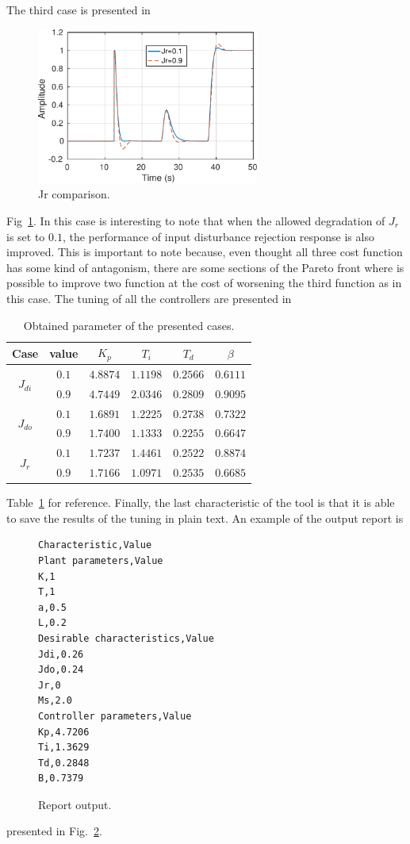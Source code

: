 The third case is presented in %
\begin{figure}
	\centering
	\includegraphics[width=0.65\textwidth]{figuras/jr_comp}
	\caption{Jr comparison.}
	\label{f:jr_comp}
\end{figure}
%
Fig~\ref{f:jr_comp}. In this case is interesting to note that when the allowed degradation of $J_r$ is set to $0.1$, the performance of input disturbance rejection response is also improved. This is important to note because, even thought all three cost function has some kind of antagonism, there are some sections of the Pareto front where is possible to improve two function at the cost of worsening the third function as in this case. The tuning of all the controllers are presented in
%
\begin{table}
	\caption{Obtained parameter of the presented cases.}
	\label{tab:Tunings}
	\centering
	\begin{tabular}{cccccc}
		\toprule
		Case & value & $K_p$ & $T_i$ & $T_d$ & $\beta$\\
		\midrule
		\multirow{2}{*}{$J_{di}$} & $0.1$ & $4.8874$ & $1.1198$ & $0.2566$ & $0.6111$\\
								  & $0.9$ & $4.7449$ & $2.0346$ & $0.2809$ & $0.9095$ \\
		\midrule
		\multirow{2}{*}{$J_{do}$} & $0.1$ & $1.6891$ & $1.2225$ & $0.2738$ & $0.7322$\\
								  & $0.9$ & $1.7400$ & $1.1333$ & $0.2255$ & $0.6647$\\
		\midrule
		\multirow{2}{*}{$J_{r}$}  & $0.1$ & $1.7237$ & $1.4461$ & $0.2522$ & $0.8874$\\
								  & $0.9$ & $1.7166$ & $1.0971$ & $0.2535$ & $0.6685$\\
		\bottomrule
	\end{tabular}
\end{table}
%
Table~\ref{tab:Tunings} for reference. Finally, the last characteristic of the tool is that it is able to save the results of the tuning in plain text. An example of the output report is %
%
\begin{figure}
\centering
\begin{tcolorbox}
\begin{verbatim}
Characteristic,Value
Plant parameters,Value
K,1
T,1
a,0.5
L,0.2
Desirable characteristics,Value
Jdi,0.26
Jdo,0.24
Jr,0
Ms,2.0
Controller parameters,Value
Kp,4.7206
Ti,1.3629
Td,0.2848
B,0.7379
\end{verbatim}
\end{tcolorbox}
\caption{Report output.}
\label{f:report_tuning}
\end{figure}
%
presented in Fig.~\ref{f:report_tuning}.